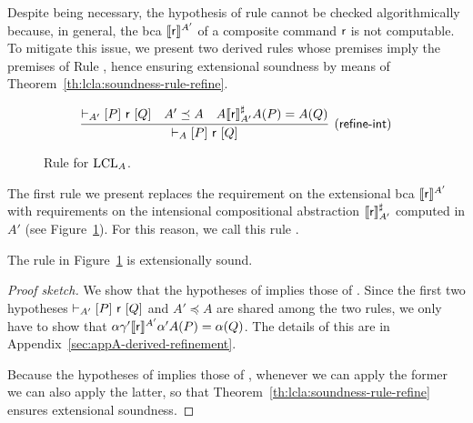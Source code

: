 Despite being necessary, the hypothesis of rule  cannot be checked algorithmically because, in general, the bca $\llbracket\mathsf{r}\rrbracket^{A'}$ of a composite command $\mathsf{r}$ is not computable. To mitigate this issue, we present two derived rules whose premises imply the premises of Rule , hence ensuring extensional soundness by means of Theorem~\ref{th:lcla:soundness-rule-refine}.

\begin{figure*}[t]
	\begin{framed}
		\[
		\infer[\lclrule{refine\mbox{-}int}]
		{\lcl{A}{P}{\regr}{Q}}
		{\lcl{A'}{P}{\regr}{Q} \quad A' \preceq A \quad A \denot{\regr}^{\sharp}_{A'} A(P) = A(Q) }		
		\]
	\end{framed}
	\vspace{-1ex}
	\caption{Rule  for $\text{LCL}_A$.}\label{fig:lcla:rule-refine-int}
\end{figure*}


The first rule we present replaces the requirement on the extensional bca $\llbracket\mathsf{r}\rrbracket^{A'}$ with requirements on the intensional compositional abstraction $\llbracket\mathsf{r}\rrbracket^{\sharp}_{A'}$ computed in $A'$ (see Figure~\ref{fig:lcla:rule-refine-int}). For this reason, we call this rule .

\begin{prop}\label{th:lcla:refine-int-sound}
	The rule  in Figure~\ref{fig:lcla:rule-refine-int} is extensionally sound.
\end{prop}
\begin{proof}[Proof sketch]
	We show that the hypotheses of  implies those of . Since the first two hypotheses $\vdash_{A'}\nobreak[P]~\mathsf{r}~[Q]$ and $A' \preceq A$ are shared among the two rules, we only have to show that $\alpha \gamma' \llbracket\mathsf{r}\rrbracket^{A'} \alpha' A(P) = \alpha(Q)$. The details of this are in Appendix~\ref{sec:appA-derived-refinement}.
	
	Because the hypotheses of  implies those of , whenever we can apply the former we can also apply the latter, so that Theorem~\ref{th:lcla:soundness-rule-refine} ensures extensional soundness.
\end{proof}

